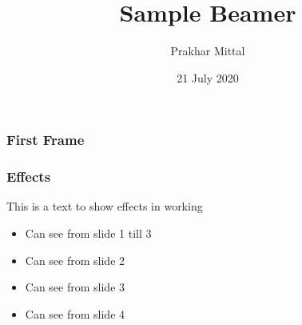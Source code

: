 \documentclass{beamer}
\title{Sample Beamer}
\author[Prakhar]{Prakhar Mittal}
\institute[IIT-B]{IIT Bombay}
\date{21 July 2020}
\begin{document}
    \frame{\titlepage}
    \begin{frame}
        \frametitle{First Frame}
        \lipsum[1]
    \end{frame}
    \begin{frame}
        \frametitle{Effects}
        This is a text \pause to show effects in working
        \begin{itemize}
            \item<2-3>Can see from slide 1 till 3
            \item <2-> Can see from slide 2
            \item <3-> Can see from slide 3
            \item <4-> Can see from slide 4
        \end{itemize}
    
    \end{frame}
\end{document}
